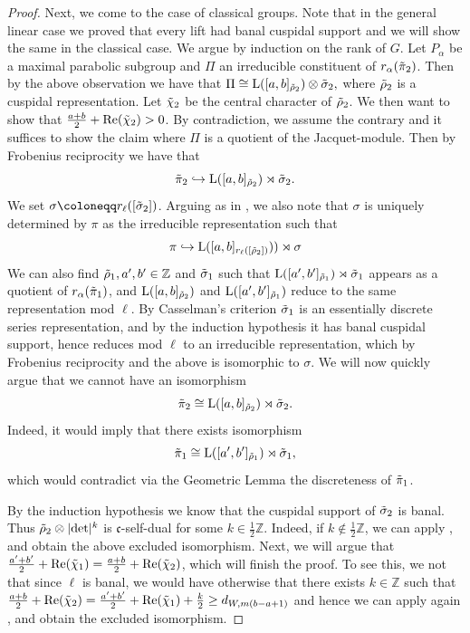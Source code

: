 \documentclass[10pt,a4paper]{article}
\theoremstyle{remark}
\theoremstyle{definition}
\newcommand{\tpi}{\Tilde{\pi}}
\newcommand{\trho}{{\Tilde{\rho}}}
\newcommand{\tsigma}{\Tilde{\sigma}}
\newcommand{\rl}{r_\ell}
\newcommand{\Z}{\mathrm{L}}
\newcommand{\hra}{\hookrightarrow}
\newcommand{\ZZ}{\mathbb{Z}}
\newcommand{\tchi}{\Tilde{\chi}}
\newcommand{\fc}{\mathfrak{c}}
\begin{document}
\begin{proof}
    Next, we come to the case of classical groups. Note that in the general linear case we proved that every lift had banal cuspidal support and we will show the same in the classical case. We argue by induction on the rank of $G$. Let $P_\alpha$ be a maximal parabolic subgroup and $\Pi$ an irreducible constituent of $r_\alpha(\tpi_2)$. Then by the above observation we have that $\Pi\cong \Z([a,b]_{\trho_2})\otimes \tsigma_2,$ where $\trho_2$ is a cuspidal representation. Let $\tchi_2$ be the central character of $\trho_2$. We then want to show that $\frac{a+b}{2}+\mathrm{Re}(\tchi_2)>0$. By contradiction, we assume the contrary and it suffices to show the claim where $\Pi$ is a quotient of the Jacquet-module. Then by Frobenius reciprocity we have that 
    \[\tpi_2\hra \Z([a,b]_{\trho_2})\rtimes \tsigma_2.\]
    We set $\sigma\coloneqq \rl([\tsigma_2])$.
    Arguing as in \cite[3.2]{Droschl2025symp}, we also note that $\sigma$ is uniquely determined by $\pi$ as the irreducible representation such that \[\pi\hra  \Z([a,b]_{\rl([\trho_2])}))\rtimes\sigma\]
    We can also find $\trho_1,a',b'\in\ZZ$ and $\tsigma_1$ such that 
   $\Z([a',b']_{\trho_1})\rtimes \tsigma_1$ appears as a quotient of $r_\alpha(\tpi_1)$, and $\Z([a,b]_{\trho_2})$ and $\Z([a',b']_{\trho_1})$ reduce to the same representation mod $\ell$. By Casselman's criterion $\tsigma_1$ is an essentially discrete series representation, and by the induction hypothesis it has banal cuspidal support, hence reduces mod $\ell$ to an irreducible representation, which by Frobenius reciprocity and the above is isomorphic to $\sigma$. 
We will now quickly argue that we cannot have an isomorphism \[\tpi_2\cong \Z([a,b]_{\trho_2})\rtimes\tsigma_2.\] Indeed, it would imply that there exists isomorphism \[\tpi_1\cong \Z([a',b']_{\trho_1})\rtimes \tsigma_1,\] which would contradict via the Geometric Lemma the discreteness of $\tpi_1$.
    
By the induction hypothesis we know that the cuspidal support of $\tsigma_2$ is banal.
   Thus ${\trho_2}\otimes\lvert\det\rvert^k$ is $\fc$-self-dual for some $k\in\frac{1}{2}\mathbb{Z}$. Indeed, if $k\notin\frac{1}{2}\mathbb{Z}$, we can apply , and obtain the above excluded isomorphism.
   Next, we will argue that $\frac{a'+b'}{2}+\mathrm{Re}(\tchi_1)=\frac{a+b}{2}+\mathrm{Re}(\tchi_2)$, which will finish the proof. To see this, we not that since $\ell$ is banal, we would have otherwise that there exists $k\in\ZZ$ such that $\frac{a+b}{2}+\mathrm{Re}(\tchi_2)=\frac{a'+b'}{2}+\mathrm{Re}(\tchi_1)+\frac{k}{2}\ge d_{W,m(b-a+1)}$ and hence we can apply again , and obtain the excluded isomorphism.
\end{proof}
\end{document}
